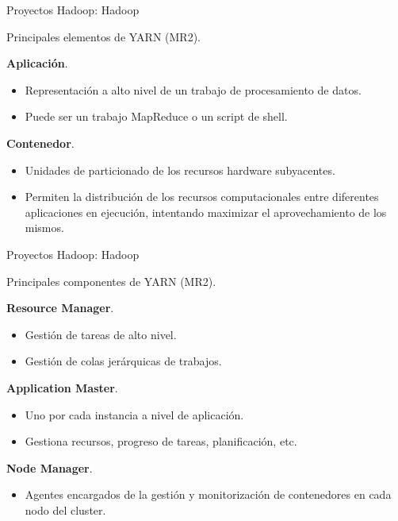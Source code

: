 \begin{frame}{Proyectos Hadoop: Hadoop}
 \begin{wideitemize}
  \item Principales elementos de YARN (MR2).
  
  \item \textbf{Aplicación}.
  \begin{itemize}
   \item Representación a alto nivel de un trabajo de procesamiento de datos.
   \item Puede ser un trabajo MapReduce o un script de shell.
  \end{itemize}
  
  \item \textbf{Contenedor}.
  \begin{itemize}
   \item Unidades de particionado de los recursos hardware subyacentes.
   \item Permiten la distribución de los recursos computacionales entre diferentes
   aplicaciones en ejecución, intentando maximizar el aprovechamiento de los mismos.
  \end{itemize}

 \end{wideitemize}

\end{frame}


\begin{frame}{Proyectos Hadoop: Hadoop}
 \begin{wideitemize}
  \item Principales componentes de YARN (MR2).
  
  \item \textbf{Resource Manager}.
  \begin{itemize}
   \item Gestión de tareas de alto nivel.
   \item Gestión de colas jerárquicas de trabajos.
  \end{itemize}
  
  \item \textbf{Application Master}.
  \begin{itemize}
   \item Uno por cada instancia a nivel de aplicación.
   \item Gestiona recursos, progreso de tareas, planificación, etc.
  \end{itemize}

  
  \item \textbf{Node Manager}.
  \begin{itemize}
   \item Agentes encargados de la gestión y monitorización de contenedores en
   cada nodo del cluster.
  \end{itemize}

 \end{wideitemize}

\end{frame}

